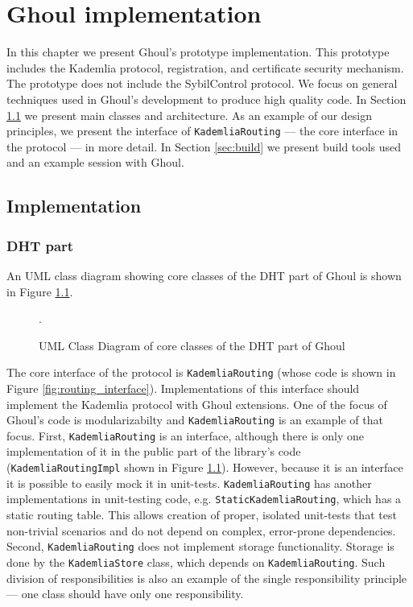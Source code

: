 \chapter{Ghoul implementation}
\label{ch:implementation}
In this chapter we present Ghoul's prototype implementation.
This prototype includes the Kademlia protocol, registration, and certificate
security mechanism.
The prototype does not include the SybilControl protocol.
We focus on general techniques used in Ghoul's development to produce high
quality code.
In Section \ref{sec:implementation} we present main classes and architecture.
As an example of our design principles, we present the interface of
\texttt{KademliaRouting} --- the core interface in the protocol --- in more
detail.
In Section \ref{sec:build} we present build tools used and an example session
with Ghoul.

\section{Implementation}
\label{sec:implementation}

\subsection{DHT part}

An UML class diagram showing core classes of the DHT part of Ghoul is shown in
Figure \ref{fig:dht_class_diagram}.

\begin{figure}[tbp]
  \centering
\resizebox{\columnwidth}{!}{}
\caption{UML Class Diagram of core classes of the DHT part of Ghoul}
\label{fig:dht_class_diagram}.
\end{figure}

The core interface of the protocol is \texttt{KademliaRouting} (whose code is
shown in Figure \ref{fig:routing_interface}).
Implementations of this interface should implement the Kademlia protocol with
Ghoul extensions.
One of the focus of Ghoul's code is modularizabilty and \texttt{KademliaRouting}
is an example of that focus.
First, \texttt{KademliaRouting} is an interface, although there is only one
implementation of it in the public part of the library's code
(\texttt{KademliaRoutingImpl} shown in Figure \ref{fig:dht_class_diagram}).
However, because it is an interface it is possible to easily mock it in
unit-tests.
\texttt{KademliaRouting} has another implementations in unit-testing code, e.g.
\texttt{StaticKademliaRouting}, which has a static routing table.
This allows creation of proper, isolated unit-tests that test non-trivial
scenarios and do not depend on complex, error-prone dependencies.
Second, \texttt{KademliaRouting} does not implement storage functionality.
Storage is done by the \texttt{KademliaStore} class, which depends on
\texttt{KademliaRouting}.
Such division of responsibilities is also an example of the single
responsibility principle --- one class should have only one responsibility.

